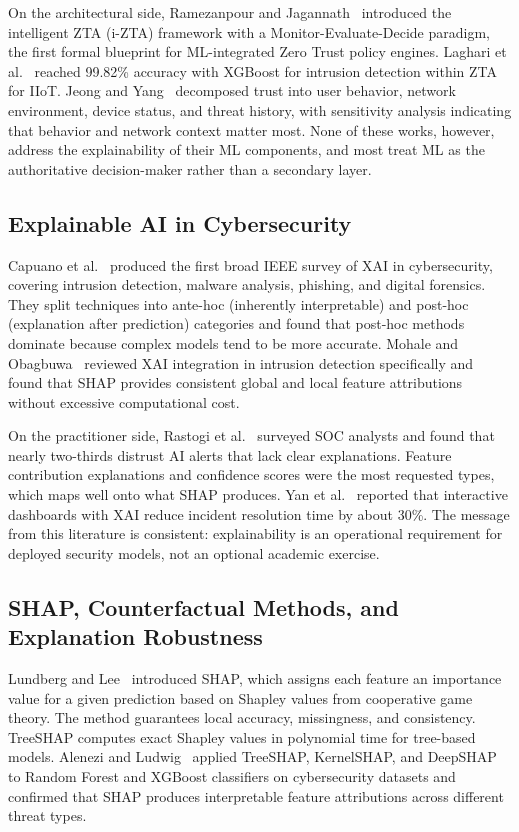 \documentclass[conference]{IEEEtran}
\begin{document}
On the architectural side, Ramezanpour and Jagannath~\cite{ramezanpour2022} introduced the intelligent ZTA (i-ZTA) framework with a Monitor-Evaluate-Decide paradigm, the first formal blueprint for ML-integrated Zero Trust policy engines. Laghari et al.~\cite{laghari2025} reached 99.82\% accuracy with XGBoost for intrusion detection within ZTA for IIoT. Jeong and Yang~\cite{jeong2025} decomposed trust into user behavior, network environment, device status, and threat history, with sensitivity analysis indicating that behavior and network context matter most. None of these works, however, address the explainability of their ML components, and most treat ML as the authoritative decision-maker rather than a secondary layer.

\subsection{Explainable AI in Cybersecurity}

Capuano et al.~\cite{capuano2022} produced the first broad IEEE survey of XAI in cybersecurity, covering intrusion detection, malware analysis, phishing, and digital forensics. They split techniques into ante-hoc (inherently interpretable) and post-hoc (explanation after prediction) categories and found that post-hoc methods dominate because complex models tend to be more accurate. Mohale and Obagbuwa~\cite{mohale2025} reviewed XAI integration in intrusion detection specifically and found that SHAP provides consistent global and local feature attributions without excessive computational cost.

On the practitioner side, Rastogi et al.~\cite{rastogi2025} surveyed SOC analysts and found that nearly two-thirds distrust AI alerts that lack clear explanations. Feature contribution explanations and confidence scores were the most requested types, which maps well onto what SHAP produces. Yan et al.~\cite{yan2022} reported that interactive dashboards with XAI reduce incident resolution time by about 30\%. The message from this literature is consistent: explainability is an operational requirement for deployed security models, not an optional academic exercise.

\subsection{SHAP, Counterfactual Methods, and Explanation Robustness}

Lundberg and Lee~\cite{lundberg2017} introduced SHAP, which assigns each feature an importance value for a given prediction based on Shapley values from cooperative game theory. The method guarantees local accuracy, missingness, and consistency. TreeSHAP computes exact Shapley values in polynomial time for tree-based models. Alenezi and Ludwig~\cite{alenezi2021} applied TreeSHAP, KernelSHAP, and DeepSHAP to Random Forest and XGBoost classifiers on cybersecurity datasets and confirmed that SHAP produces interpretable feature attributions across different threat types.
\end{document}
